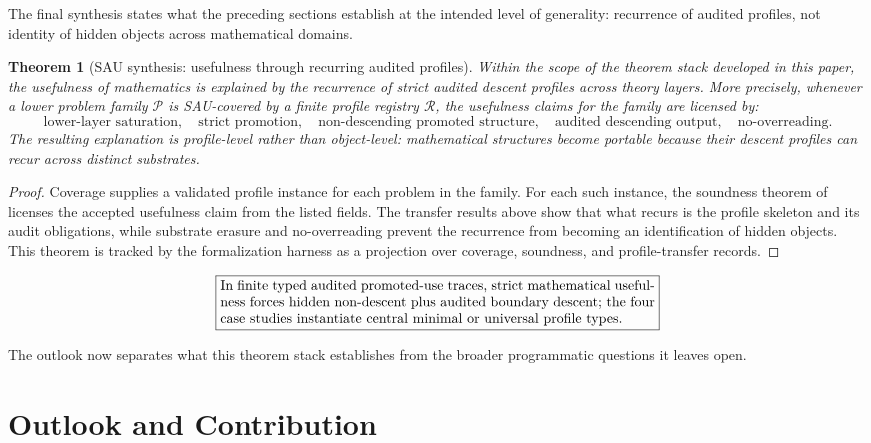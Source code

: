 \documentclass[11pt]{article}
\newtheorem{theorem}{Theorem}[section]
\theoremstyle{definition}
\begin{document}
The final synthesis states what the preceding sections establish at the intended
level of generality: recurrence of audited profiles, not identity of hidden
objects across mathematical domains.

\begingroup
\hfuzz=150pt
\begin{theorem}[SAU synthesis: usefulness through recurring audited profiles]
\label{thm:sau-final-synthesis}
Within the scope of the theorem stack developed in this paper, the usefulness of mathematics is explained by the recurrence of strict audited descent profiles across theory layers.  More precisely, whenever a lower problem family \(\mathcal P\) is SAU-covered by a finite profile registry \(\mathcal R\), the usefulness claims for the family are licensed by:
\[
\text{lower-layer saturation},
\quad
\text{strict promotion},
\quad
\text{non-descending promoted structure},
\quad
\text{audited descending output},
\quad
\text{no-overreading}.
\]
The resulting explanation is profile-level rather than object-level: mathematical structures become portable because their descent profiles can recur across distinct substrates.
\end{theorem}
\endgroup

\begin{proof}
Coverage supplies a validated profile instance for each problem in the family.
For each such instance, the soundness theorem of 
licenses the accepted usefulness claim from the listed fields.  The transfer
results above show that what recurs is the profile skeleton and its audit
obligations, while substrate erasure and no-overreading prevent the recurrence
from becoming an identification of hidden objects.  This theorem is tracked by
the formalization harness as a projection over coverage, soundness, and
profile-transfer records.
\end{proof}

\[
\fbox{\begin{minipage}{0.9\textwidth}
In finite typed audited promoted-use traces, strict mathematical usefulness
forces hidden non-descent plus audited boundary descent; the four case studies
instantiate central minimal or universal profile types.
\end{minipage}}
\]

The outlook now separates what this theorem stack establishes from the broader
programmatic questions it leaves open.
 \section{Outlook and Contribution}\label{sec:outlook}
\end{document}
